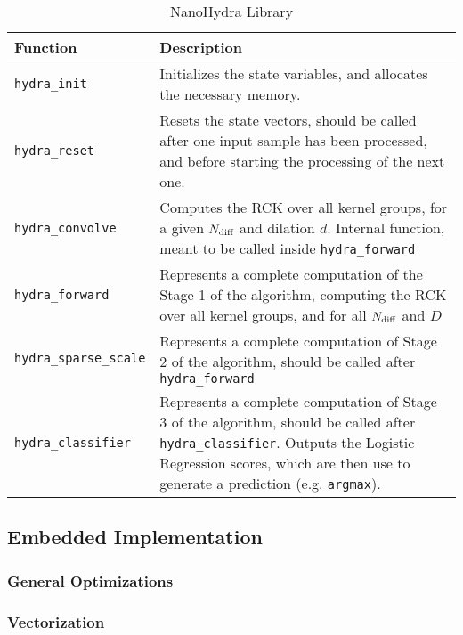     \begin{table}[h!]
    \begin{tabular}{||p{1.5in}|p{4in}||}
        \hline
        Function & Description  \\

        \hline\hline
        \verb|hydra_init| & Initializes the state variables, and allocates the necessary memory. \\
        \hline
        \verb|hydra_reset| & Resets the state vectors, should be called after one input sample has been processed, and before starting the processing of the next one. \\
        \hline
        \verb|hydra_convolve|   & Computes the RCK over all kernel groups, for a given $N\sb{\text{diff}}$ and dilation $d$. Internal function, meant to be called inside \verb|hydra_forward|\\
        \hline
        \verb|hydra_forward|   & Represents a complete computation of the Stage 1 of the algorithm, computing the RCK over all kernel groups, and for all $N\sb{\text{diff}}$ and $D$\\
        \hline
        \verb|hydra_sparse_scale|   & Represents a complete computation of Stage 2 of the algorithm, should be called after \verb|hydra_forward|\\
        \hline
        \verb|hydra_classifier|     & Represents a complete computation of Stage 3 of the algorithm, should be called after \verb|hydra_classifier|. Outputs the Logistic Regression scores, which are then use to generate a prediction (e.g. \verb|argmax|).\\
        \hline
    \end{tabular}
    \caption{NanoHydra Library}
    \label{tbl:library_c}
    \end{table}

    \subsection{Embedded Implementation}\label{sec:im_nanohydra_embimp}

        \subsubsection{General Optimizations}\label{sec:im_nanohydra_embimp_genopt}


        \subsubsection{Vectorization}\label{sec:im_nanohydra_embimp_vect}

